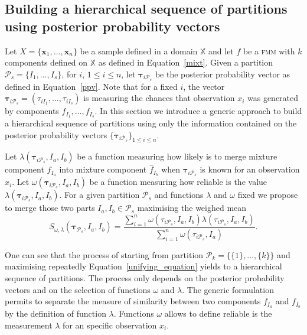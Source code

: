 \documentclass[10pt, a4paper]{article}
\newcommand{\m}[1]{\boldsymbol{#1}}
\newcommand{\fmm}{\textsc{fmm}\xspace}
\begin{document}
\begin{spacing}{1.9}
\section{Building a hierarchical sequence of partitions using posterior probability vectors}\label{generic_merging}

Let $X = \{\m x_1,\dots,\m x_n \}$ be a sample defined in  a domain $\mathbb{X}$ and let $f$ be a \fmm with $k$ components defined on $\mathbb{X}$ as defined in Equation~\ref{mixt}. Given a partition $\mathcal{P}_s = \{I_1, \dots, I_s\}$, for $i$, $1\leq i \leq n $, let $\m\tau_{i \mathcal{P}_s}$ be the posterior probability vector as defined in Equation~\ref{ppv}. Note that for a fixed $i$, the vector $\m\tau_{i \mathcal{P}_s} =  \left( \tau_{i I_1} , \dots, \tau_{i I_s}  \right)$ is measuring the chances that observation $x_i$ was generated by components $f_{I_1}, \dots, f_{I_s}$. In this section we introduce a generic approach to build a hierarchical sequence of partitions using only the information contained on the posterior probability vectors $\{\m\tau_{i \mathcal{P}_s}\}_{1\leq i \leq n}$.


Let $\lambda(\m\tau_{i \mathcal{P}_s},  I_a,  I_b)$ be a function measuring how likely is to merge mixture component $\hat{f}_{I_a}$ into mixture component $\hat{f}_{I_b}$ when $\m \tau_{i \mathcal{P}_s}$ is known for an observation $x_i$. Let $\omega(\m\tau_{i \mathcal{P}_s},  I_a,  I_b)$ be a function measuring how reliable is the value $\lambda(\m\tau_{i \mathcal{P}_s},  I_a,  I_b)$.  For a given partition $\mathcal{P}_s$ and functions $\lambda$ and $\omega$ fixed we propose to merge those two parts $I_a, I_b \in \mathcal{P}_s$ maximising the weighed mean
\begin{equation}\label{unifying_equation}
S_{\omega, \lambda}( \m\tau_{\mathcal{P}_s},  I_a,  I_b) = \frac{\sum_{i=1}^n \omega(\tau_{i \mathcal{P}_s}, I_a, I_b) \lambda(\tau_{i \mathcal{P}_s}, I_a, I_b)}{\sum_{i=1}^n \omega(\tau_{i \mathcal{P}_s}, I_a) }.
\end{equation}


One can see that the process of starting from partition $\mathcal{P}_k = \{ \{1\}, \dots, \{k\} \}$ and maximising repeatedly Equation~\ref{unifying_equation} yields to a hierarchical sequence of partitions. The process only depends on the posterior probability vectors and on the selection of functions $\omega$ and $\lambda$. The generic formulation permits to separate the measure of similarity between two components $f_{I_a}$ and $f_{I_b}$ by the definition of function $\lambda$. Functions $\omega$ allows to define reliable is the measurement $\lambda$ for an specific observation $x_i$.


\end{spacing}
\end{document}

